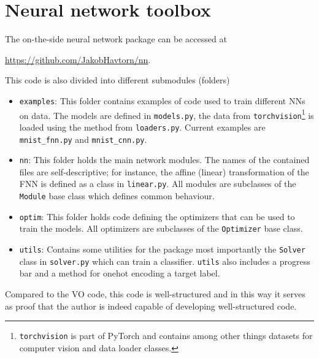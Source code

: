 \section{Neural network toolbox}
The on-the-side neural network package can be accessed at
\begin{center}
    \url{https://github.com/JakobHavtorn/nn}.    
\end{center}
This code is also divided into different submodules (folders)
\begin{itemize}
    \item \texttt{examples}: This folder contains examples of code used to train different \glspl{NN} on data. The models are defined in \texttt{models.py}, the data from \texttt{torchvision}\footnote{\texttt{torchvision} is part of PyTorch and contains among other things datasets for computer vision and data loader classes.} is loaded using the method from \texttt{loaders.py}. Current examples are \texttt{mnist\_fnn.py} and \texttt{mnist\_cnn.py}.
    \item \texttt{nn}: This folder holds the main network modules. The names of the contained files are self-descriptive; for instance, the affine (linear) transformation of the \gls{FNN} is defined as a class in \texttt{linear.py}. All modules are subclasses of the \texttt{Module} base class which defines common behaviour.
    \item \texttt{optim}: This folder holds code defining the optimizers that can be used to train the models. All optimizers are subclasses of the \texttt{Optimizer} base class.
    \item \texttt{utils}: Contains some utilities for the package most importantly the \texttt{Solver} class in \texttt{solver.py} which can train a classifier. \texttt{utils} also includes a progress bar and a method for onehot encoding a target label.
\end{itemize}
Compared to the \gls{VO} code, this code is well-structured and in this way it serves as proof that the author is indeed capable of developing well-structured code.
